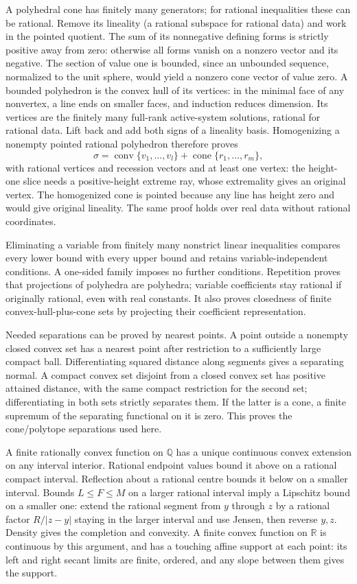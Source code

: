 \documentclass[
  11pt,
]{article}
\begin{document}
A polyhedral cone has finitely many generators; for rational
inequalities these can be rational. Remove its lineality (a rational
subspace for rational data) and work in the pointed quotient. The sum of
its nonnegative defining forms is strictly positive away from zero:
otherwise all forms vanish on a nonzero vector and its negative. The
section of value one is bounded, since an unbounded sequence, normalized
to the unit sphere, would yield a nonzero cone vector of value zero. A
bounded polyhedron is the convex hull of its vertices: in the minimal
face of any nonvertex, a line ends on smaller faces, and induction
reduces dimension. Its vertices are the finitely many full-rank
active-system solutions, rational for rational data. Lift back and add
both signs of a lineality basis. Homogenizing a nonempty pointed
rational polyhedron therefore proves \[
 \sigma=\operatorname{conv}\{v_1,\ldots,v_l\}
                    +\operatorname{cone}\{r_1,\ldots,r_m\},     \tag{8}
\] with rational vertices and recession vectors and at least one vertex:
the height-one slice needs a positive-height extreme ray, whose
extremality gives an original vertex. The homogenized cone is pointed
because any line has height zero and would give original lineality. The
same proof holds over real data without rational coordinates.

Eliminating a variable from finitely many nonstrict linear inequalities
compares every lower bound with every upper bound and retains
variable-independent conditions. A one-sided family imposes no further
conditions. Repetition proves that projections of polyhedra are
polyhedra; variable coefficients stay rational if originally rational,
even with real constants. It also proves closedness of finite
convex-hull-plus-cone sets by projecting their coefficient
representation.

Needed separations can be proved by nearest points. A point outside a
nonempty closed convex set has a nearest point after restriction to a
sufficiently large compact ball. Differentiating squared distance along
segments gives a separating normal. A compact convex set disjoint from a
closed convex set has positive attained distance, with the same compact
restriction for the second set; differentiating in both sets strictly
separates them. If the latter is a cone, a finite supremum of the
separating functional on it is zero. This proves the cone/polytope
separations used here.

A finite rationally convex function on \(\mathbb{Q}\) has a unique
continuous convex extension on any interval interior. Rational endpoint
values bound it above on a rational compact interval. Reflection about a
rational centre bounds it below on a smaller interval. Bounds
\(L\leq F\leq M\) on a larger rational interval imply a Lipschitz bound
on a smaller one: extend the rational segment from \(y\) through \(z\)
by a rational factor \(R/|z-y|\) staying in the larger interval and use
Jensen, then reverse \(y,z\). Density gives the completion and
convexity. A finite convex function on \(\mathbb{R}\) is continuous by
this argument, and has a touching affine support at each point: its left
and right secant limits are finite, ordered, and any slope between them
gives the support.
\end{document}
